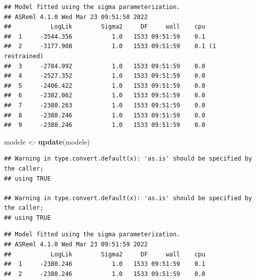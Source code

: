 \documentclass[
  12pt,
]{book}
\newenvironment{Shaded}{\begin{snugshade}}{\end{snugshade}}
\newcommand{\KeywordTok}[1]{\textcolor[rgb]{0.13,0.29,0.53}{\textbf{#1}}}
\newcommand{\NormalTok}[1]{#1}
\newcommand{\OperatorTok}[1]{\textcolor[rgb]{0.81,0.36,0.00}{\textbf{#1}}}
\newcommand{\StringTok}[1]{\textcolor[rgb]{0.31,0.60,0.02}{#1}}
\begin{document}
\begin{verbatim}
## Model fitted using the sigma parameterization.
## ASReml 4.1.0 Wed Mar 23 09:51:58 2022
##           LogLik        Sigma2     DF     wall    cpu
##  1     -3544.356           1.0   1533 09:51:59    0.1
##  2     -3177.908           1.0   1533 09:51:59    0.1 (1 restrained)
##  3     -2784.992           1.0   1533 09:51:59    0.0
##  4     -2527.352           1.0   1533 09:51:59    0.0
##  5     -2406.422           1.0   1533 09:51:59    0.0
##  6     -2382.062           1.0   1533 09:51:59    0.0
##  7     -2380.263           1.0   1533 09:51:59    0.0
##  8     -2380.246           1.0   1533 09:51:59    0.0
##  9     -2380.246           1.0   1533 09:51:59    0.0
\end{verbatim}

\begin{Shaded}
\begin{Highlighting}[]
\NormalTok{modele \textless{}{-}}\StringTok{ }\KeywordTok{update}\NormalTok{(modele)}
\end{Highlighting}
\end{Shaded}

\begin{verbatim}
## Warning in type.convert.default(x): 'as.is' should be specified by the caller;
## using TRUE

## Warning in type.convert.default(x): 'as.is' should be specified by the caller;
## using TRUE
\end{verbatim}

\begin{verbatim}
## Model fitted using the sigma parameterization.
## ASReml 4.1.0 Wed Mar 23 09:51:59 2022
##           LogLik        Sigma2     DF     wall    cpu
##  1     -2380.246           1.0   1533 09:51:59    0.1
##  2     -2380.246           1.0   1533 09:51:59    0.0
\end{verbatim}

\begin{Shaded}
\end{Shaded}
\end{document}

